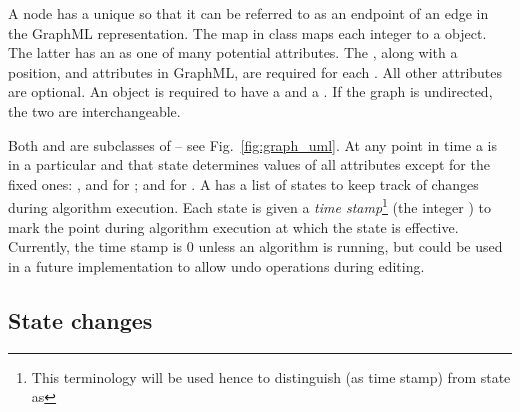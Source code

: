A node has a unique  so that it can be referred to as an endpoint of
an edge in the GraphML representation. The map  in class
 maps each integer  to a  object.
The latter has an  as one of many potential attributes.
The , along with a position,  and  attributes in
GraphML, are required for each . All other attributes are
optional.
An  object is required to have a  and a
. If the graph is undirected, the two are interchangeable.

Both  and  are subclasses of  -- see
Fig.~\ref{fig:graph_uml}.
At any point in time a  is in a particular
 and that state determines values of all attributes
except for the fixed ones: ,  and  for ;
 and  for .
A  has a list of states to keep track of changes during
algorithm execution.
Each state is given a \emph{time stamp}\footnote{This terminology will be
  used hence to distinguish  (as time stamp) from state as
  } (the integer ) to mark the point
during algorithm execution at which the state is effective. Currently, the
time stamp is 0 unless an algorithm is running, but could be used in a future
implementation to allow undo operations during editing.

\subsection{State changes}

